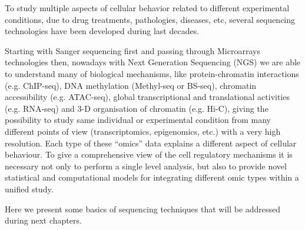 To study multiple aspects of cellular behavior related to different experimental conditions, due to drug treatments, pathologies, diseases, etc, several sequencing technologies have been developed during last decades.

Starting with Sanger sequencing first and passing through Microarrays technologies then, nowadays with Next Generation Sequencing (NGS) we are able to understand many of biological mechanisms, like protein-chromatin interactions (e.g. ChIP-seq), DNA methylation (Methyl-seq or BS-seq), chromatin accessibility (e.g. ATAC-seq), global transcriptional and translational activities (e.g. RNA-seq) and 3-D organisation of chromatin (e.g. Hi-C), giving the possibility to study same individual or experimental condition from many different points of view (transcriptomics, epigenomics, etc.) with a very high resolution. Each type of these “omics” data explains a different aspect of cellular behaviour. To give a comprehensive view of the cell regulatory mechanisms it is necessary not only to perform a single level analysis, but also to provide novel statistical and computational models for integrating different omic types within a unified study.

Here we present some basics of sequencing techniques that will be addressed during next chapters.  